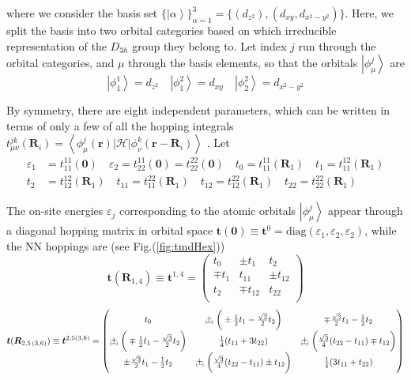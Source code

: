 where we consider the basis set $\{ \left| \alpha \right\rangle \}_{\alpha = 1}^3 = \{ (d_{z^2}) , (d_{x y}, d_{ x^2 - y^2 }) \} $.
Here, we split the basis into two orbital categories based on which irreducible representation of the $D_{3h}$ group they belong to.
Let index $j$ run through the orbital categories, and $\mu$ through the basis elements, so that the orbitals $\left| \phi_\mu^j \right\rangle$ are 
\begin{equation*}
\left| \phi_1^1 \right\rangle = d_{z^2} \quad \left| \phi_1^2 \right\rangle = d_{xy} \quad \left| \phi_2^2 \right\rangle = d_{x^2 - y^2} 
\end{equation*}

By symmetry, there are eight independent parameters, which can be written in terms of only a few of all the hopping integrals $t_{\mu \nu}^{j k} ( \bm R_i ) = \left\langle \phi_\mu^j ( \bm r ) | \mathcal{H} | \phi_{\nu}^k ( \bm r - \bm R_i ) \right\rangle$ \cite{braz_electronic_2015,liu_three-band_2013}.
Let 
\begin{equation*}
\begin{split}
\varepsilon_1 &= t_{11}^{11} ( \bm 0 ) \quad \varepsilon_2 = t_{22}^{11} ( \bm 0 ) = t_{22}^{22} ( \bm 0 ) \quad t_0 = t_{11}^{11} ( \bm R_1 ) \quad t_1 = t_{11}^{12} ( \bm R_1 ) \\
t_2 &= t_{12}^{12} ( \bm R_1 ) \quad t_{11} = t_{11}^{22} ( \bm R_1 ) \quad t_{12} = t_{12}^{22} ( \bm R_1 ) \quad t_{22} = t_{22}^{22} ( \bm R_1 )
\end{split}
\end{equation*}

The on-site energies $\varepsilon_j$ corresponding to the atomic orbitals $\left| \phi_\mu^j \right\rangle$ appear through a diagonal hopping matrix in orbital space $\bm t ( \bm 0 ) \equiv \bm t^0 = \text{diag} ( \varepsilon_1, \varepsilon_2, \varepsilon_2 )$, while the NN hoppings are (see Fig.(\ref{fig:tmdHex}))
\begin{equation}
\bm t (\bm R_{1, 4}) \equiv \bm t^{1, 4} =
\begin{pmatrix}
t_0 & \pm t_1 & t_2 \\
\mp t_1 & t_{11} & \pm t_{12} \\
t_2 & \mp t_{12} & t_{22} \\
\end{pmatrix}
\end{equation}
\begin{equation}
\bm t (\bm R_{2,5\,(3,6)})  \equiv \bm t^{2, 5 (3, 6)}  =
\begin{pmatrix}
t_0 & \Pm \bigg( \pm \frac{1}{2} t_1 - \frac{\sqrt{3}}{2} t_2 \bigg) & \mp \frac{\sqrt{3}}{2} t_1 - \frac{1}{2} t_2 \\
\Pm \bigg( \mp \frac{1}{2} t_1 - \frac{\sqrt{3}}{2} t_2 \bigg) & \frac{1}{4} ( t_{11} + 3 t_{22} ) & \Pm \bigg( \frac{\sqrt{3}}{4} ( t_{22} - t_{11} ) \mp t_{12} \bigg) \\
\pm \frac{\sqrt{3}}{2} t_1 - \frac{1}{2} t_2 & \Pm \bigg( \frac{\sqrt{3}}{4} ( t_{22} - t_{11} ) \pm t_{12} \bigg) & \frac{1}{4} ( 3 t_{11} + t_{22} )
\end{pmatrix}
\end{equation}

